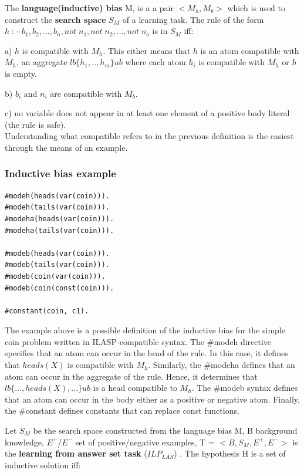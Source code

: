 The \textbf{language(inductive) bias} M, is a a pair $<M_h, M_b>$ which is used to construct the \textbf{search space} $S_M$ of a learning task.
The rule of the form  \\$ h \;{:-} b_1, b_2, ..., b_n, not\; n_1, not\; n_2, ..., not\; n_o$ is in $S_M$ iff:
 
 a) $h$ is compatible with $M_h$. This either means that $h$ is an atom compatible with $M_h$, an aggregate $lb\{h_1,.., h_m\}ub$ where each atom $h_i$ is compatible with $M_h$ or $h$ is empty.
 
 b) $b_i$ and $n_i$ are compatible with $M_b$.
 
 c) no variable does not appear in at least one element  of a positive body literal (the rule is safe). \\ 
 
Understanding what compatible refers to in the previous definition is the easiest through the means of an example.

\subsubsection{Inductive bias example}
\begin{verbatim}
#modeh(heads(var(coin))).
#modeh(tails(var(coin))).
#modeha(heads(var(coin))).
#modeha(tails(var(coin))).

#modeb(heads(var(coin))).
#modeb(tails(var(coin))).
#modeb(coin(var(coin))).
#modeb(coin(const(coin))).

#constant(coin, c1).
\end{verbatim}

The example above is a possible definition of the inductive bias for the simple coin problem written in ILASP-compatible syntax.
The \#modeh directive specifies that an atom can occur in the head of the rule. In this case, it defines that $heads(X)$ is compatible with $M_h$.
Similarly, the \#modeha defines that an atom can occur in the aggregate of the rule. Hence, it determines that  $lb\{..., heads(X), ...\}ub$ is a head compatible to $M_h$.
The \#modeb syntax defines that an atom can occur in the body either as a positive or negative atom.
Finally, the \#constant defines constants that can replace const functions.

Let $S_M$ be the search space constructed from the language bias M, B background knowledge, $E^+$/$E^-$ set of positive/negative examples, T = $<B, S_M, E^+, E^->$ is the \textbf{learning from answer set task} ($ILP_{LAS}$) \cite{RefWorks:RefID:47-law2014inductive}.
The hypothesis H is a set of inductive solution iff:


